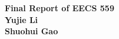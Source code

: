 \documentclass[12pt,a4paper]{report}
\begin{document}
\begin{center}
    {\bfseries\fontsize{22}{24}\selectfont Final Report of EECS 559 \\{ \small Yujie Li} \\ {\small Shuohui Gao}}
\end{center}


\end{document}
